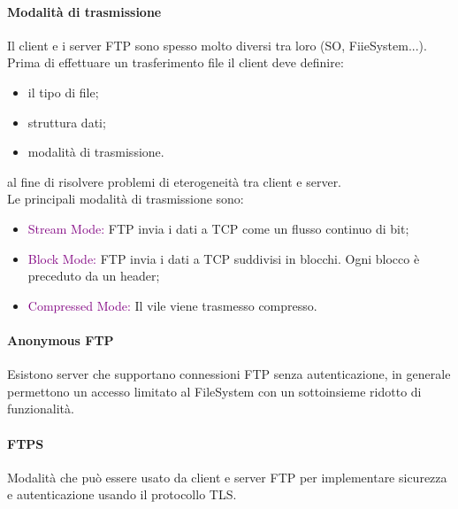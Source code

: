 \newblock
\paragraph{Modalità di trasmissione}
Il client e i server FTP sono spesso molto diversi tra loro (SO, FiieSystem...). Prima di effettuare un trasferimento file il client deve definire:
\begin{itemize}
    \item il tipo di file;
    \item struttura dati;
    \item modalità di trasmissione.
\end{itemize}
al fine di risolvere problemi di eterogeneità tra client e server.
\\Le principali modalità di trasmissione sono:
\begin{itemize}
    \item \textcolor{purple}{Stream Mode:} FTP invia i dati a TCP come un flusso continuo di bit;
    \item \textcolor{purple}{Block Mode:} FTP invia i dati a TCP suddivisi in blocchi. Ogni blocco è preceduto da un header;
    \item \textcolor{purple}{Compressed Mode:} Il vile viene trasmesso compresso.
\end{itemize}

\paragraph{Anonymous FTP}
Esistono server che supportano connessioni FTP senza autenticazione, in generale permettono un accesso limitato al FileSystem con un sottoinsieme ridotto di funzionalità.

\paragraph{FTPS}
Modalità che può essere usato da client e server FTP per implementare sicurezza e autenticazione usando il protocollo TLS.

